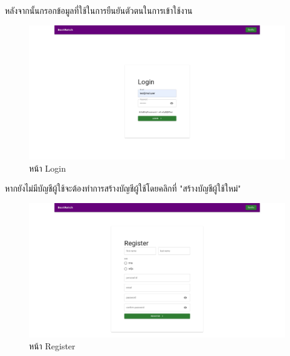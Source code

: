 หลังจากนั้นกรอกข้อมูลที่ใช้ในการยืนยันตัวตนในการเข้าใช้งาน
\begin{figure}[!ht]
  \begin{center}
    \includegraphics[width=\linewidth]{photo/web/student/login.jpeg}
  \end{center}
  \caption{หน้า Login}
\end{figure}
%
\newline
หากยังไม่มีบัญชีผู้ใช้จะต้องทำการสร้างบัญชีผู้ใช้โดยคลิกที่ "สร้างบัญชีผู้ใช้ใหม่"
\begin{figure}[!ht]
  \begin{center}
    \includegraphics[width=\linewidth]{photo/web/student/register.jpeg}
  \end{center}
  \caption{หน้า Register}
\end{figure}
\newpage

